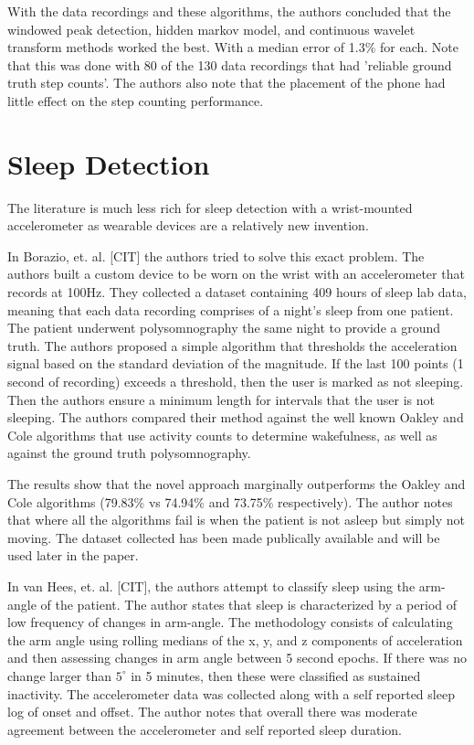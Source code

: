                 With the data recordings and these algorithms, the authors concluded that the windowed peak detection, hidden markov model, and continuous wavelet transform methods worked the best. With a median error of 1.3\% for each. Note that this was done with 80 of the 130 data recordings that had 'reliable ground truth step counts'. The authors also note that the placement of the phone had little effect on the step counting performance. 


        \section{Sleep Detection}

            The literature is much less rich for sleep detection with a wrist-mounted accelerometer as wearable devices are a relatively new invention. 

            In Borazio, et. al. [CIT] the authors tried to solve this exact problem. The authors built a custom device to be worn on the wrist with an accelerometer that records at 100Hz. They collected a dataset containing 409 hours of sleep lab data, meaning that each data recording comprises of a night's sleep from one patient. The patient underwent polysomnography the same night to provide a ground truth. The authors proposed a simple algorithm that thresholds the acceleration signal based on the standard deviation of the magnitude. If the last 100 points (1 second of recording) exceeds a threshold, then the user is marked as not sleeping. Then the authors ensure a minimum length for intervals that the user is not sleeping. The authors compared their method against the well known Oakley and Cole algorithms that use activity counts to determine wakefulness, as well as against the ground truth polysomnography. 

            The results show that the novel approach marginally outperforms the Oakley and Cole algorithms (79.83\% vs 74.94\% and 73.75\% respectively). The author notes that where all the algorithms fail is when the patient is not asleep but simply not moving. The dataset collected has been made publically available and will be used later in the paper. 

            In van Hees, et. al. [CIT], the authors attempt to classify sleep using the arm-angle of the patient. The author states that sleep is characterized by a period of low frequency of changes in arm-angle. The methodology consists of calculating the arm angle using rolling medians of the x, y, and z components of acceleration and then assessing changes in arm angle between 5 second epochs. If there was no change larger than $5^{\circ}$ in 5 minutes, then these were classified as sustained inactivity. The accelerometer data was collected along with a self reported sleep log of onset and offset. The author notes that overall there was moderate agreement between the accelerometer and self reported sleep duration.